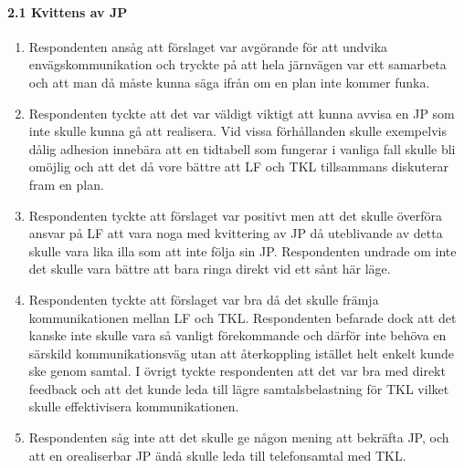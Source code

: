 \paragraph{2.1 Kvittens av JP}
\begin{enumerate}
    \item Respondenten ansåg att förslaget var avgörande för att undvika envägskommunikation och tryckte på att hela järnvägen var ett samarbeta och att man då måste kunna säga ifrån om en plan inte kommer funka.
    \item Respondenten tyckte att det var väldigt viktigt att kunna avvisa en JP som inte skulle kunna gå att realisera.
    Vid vissa förhållanden skulle exempelvis dålig adhesion innebära att en tidtabell som fungerar i vanliga fall skulle bli omöjlig och att det då vore bättre att LF och TKL tillsammans diskuterar fram en plan.
    \item Respondenten tyckte att förslaget var positivt men att det skulle överföra ansvar på LF att vara noga med kvittering av JP då uteblivande av detta skulle vara lika illa som att inte följa sin JP\@.
    Respondenten undrade om inte det skulle vara bättre att bara ringa direkt vid ett sånt här läge.
    \item Respondenten tyckte att förslaget var bra då det skulle främja kommunikationen mellan LF och TKL\@.
    Respondenten befarade dock att det kanske inte skulle vara så vanligt förekommande och därför inte behöva en särskild kommunikationsväg utan att återkoppling istället helt enkelt kunde ske genom samtal.
    I övrigt tyckte respondenten att det var bra med direkt feedback och att det kunde leda till lägre samtalsbelastning för TKL vilket skulle effektivisera kommunikationen.
    \item Respondenten såg inte att det skulle ge någon mening att bekräfta JP\@, och att en orealiserbar JP ändå skulle leda till telefonsamtal med TKL.
\end{enumerate}
\hspace{-12pt}

